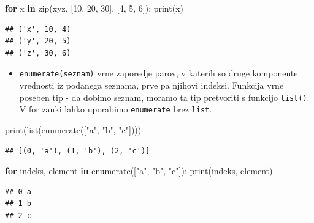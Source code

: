 \documentclass[
]{book}
\newenvironment{Shaded}{\begin{snugshade}}{\end{snugshade}}
\newcommand{\BuiltInTok}[1]{#1}
\newcommand{\ControlFlowTok}[1]{\textcolor[rgb]{0.13,0.29,0.53}{\textbf{#1}}}
\newcommand{\DecValTok}[1]{\textcolor[rgb]{0.00,0.00,0.81}{#1}}
\newcommand{\KeywordTok}[1]{\textcolor[rgb]{0.13,0.29,0.53}{\textbf{#1}}}
\newcommand{\NormalTok}[1]{#1}
\newcommand{\StringTok}[1]{\textcolor[rgb]{0.31,0.60,0.02}{#1}}
\providecommand{\tightlist}{%
  \setlength{\itemsep}{0pt}\setlength{\parskip}{0pt}}
\begin{document}
\begin{Shaded}
\begin{Highlighting}[]
\ControlFlowTok{for}\NormalTok{ x }\KeywordTok{in} \BuiltInTok{zip}\NormalTok{(}\StringTok{\textquotesingle{}xyz\textquotesingle{}}\NormalTok{, [}\DecValTok{10}\NormalTok{, }\DecValTok{20}\NormalTok{, }\DecValTok{30}\NormalTok{], [}\DecValTok{4}\NormalTok{, }\DecValTok{5}\NormalTok{, }\DecValTok{6}\NormalTok{]):}
    \BuiltInTok{print}\NormalTok{(x)}
\end{Highlighting}
\end{Shaded}

\begin{verbatim}
## ('x', 10, 4)
## ('y', 20, 5)
## ('z', 30, 6)
\end{verbatim}

\begin{itemize}
\tightlist
\item
  \texttt{enumerate(seznam)} vrne zaporedje parov, v katerih so druge komponente vrednosti
  iz podanega seznama, prve pa njihovi indeksi.
  Funkcija vrne poseben tip - da dobimo seznam, moramo ta tip
  pretvoriti s funkcijo \texttt{list()}. V for zanki lahko uporabimo \texttt{enumerate} brez \texttt{list}.
\end{itemize}

\begin{Shaded}
\begin{Highlighting}[]
\BuiltInTok{print}\NormalTok{(}\BuiltInTok{list}\NormalTok{(}\BuiltInTok{enumerate}\NormalTok{([}\StringTok{"a"}\NormalTok{, }\StringTok{"b"}\NormalTok{, }\StringTok{"c"}\NormalTok{])))}
\end{Highlighting}
\end{Shaded}

\begin{verbatim}
## [(0, 'a'), (1, 'b'), (2, 'c')]
\end{verbatim}

\begin{Shaded}
\begin{Highlighting}[]
\ControlFlowTok{for}\NormalTok{ indeks, element }\KeywordTok{in} \BuiltInTok{enumerate}\NormalTok{([}\StringTok{"a"}\NormalTok{, }\StringTok{"b"}\NormalTok{, }\StringTok{"c"}\NormalTok{]):}
    \BuiltInTok{print}\NormalTok{(indeks, element)}
\end{Highlighting}
\end{Shaded}

\begin{verbatim}
## 0 a
## 1 b
## 2 c
\end{verbatim}
\end{document}
